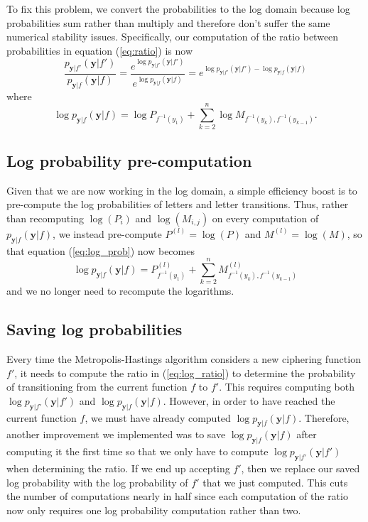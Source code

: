 \documentclass{article}
\begin{document}
To fix this problem, we convert the probabilities to the log domain because log probabilities sum rather than multiply and therefore don't suffer the same numerical stability issues. Specifically, our computation of the ratio between probabilities in equation (\ref{eq:ratio}) is now
\begin{equation}\label{eq:log_ratio}
    \frac{p_{\mathbf{y}|f'}(\mathbf{y}|f')}{p_{\mathbf{y}|f}(\mathbf{y}|f)} = \frac{e^{\log{p_{\mathbf{y}|f'}(\mathbf{y}|f')}}}{e^{\log{p_{\mathbf{y}|f}(\mathbf{y}|f)}}} = e^{\log{p_{\mathbf{y}|f'}(\mathbf{y}|f')} - \log{p_{\mathbf{y}|f}(\mathbf{y}|f)}}
\end{equation}
where
\begin{equation}\label{eq:log_prob}
    \log{p_{\mathbf{y}|f}(\mathbf{y}|f)} = \log{P_{f^{-1}(y_1)}} + \sum_{k=2}^n \log{M_{f^{-1}(y_k), f^{-1}(y_{k-1})}}.
\end{equation}

\subsection{Log probability pre-computation}

Given that we are now working in the log domain, a simple efficiency boost is to pre-compute the log probabilities of letters and letter transitions. Thus, rather than recomputing $\log(P_i)$ and $\log(M_{i,j})$ on every computation of $p_{\mathbf{y}|f}(\mathbf{y}|f)$, we instead pre-compute $P^{(l)} = \log(P)$ and $M^{(l)} = \log(M)$, so that equation (\ref{eq:log_prob}) now becomes
\begin{equation}\label{eq:log_prob_precompute}
    \log{p_{\mathbf{y}|f}(\mathbf{y}|f)} = P^{(l)}_{f^{-1}(y_1)} + \sum_{k=2}^n M^{(l)}_{f^{-1}(y_k), f^{-1}(y_{k-1})}
\end{equation}
and we no longer need to recompute the logarithms.

\subsection{Saving log probabilities}

Every time the Metropolis-Hastings algorithm considers a new ciphering function $f'$, it needs to compute the ratio in (\ref{eq:log_ratio}) to determine the probability of transitioning from the current function $f$ to $f'$. This requires computing both $\log{p_{\mathbf{y}|f'}(\mathbf{y}|f')}$ and $\log{p_{\mathbf{y}|f}(\mathbf{y}|f)}$. However, in order to have reached the current function $f$, we must have already computed $\log{p_{\mathbf{y}|f}(\mathbf{y}|f)}$. Therefore, another improvement we implemented was to save $\log{p_{\mathbf{y}|f}(\mathbf{y}|f)}$ after computing it the first time so that we only have to compute $\log{p_{\mathbf{y}|f'}(\mathbf{y}|f')}$ when determining the ratio. If we end up accepting $f'$, then we replace our saved log probability with the log probability of $f'$ that we just computed. This cuts the number of computations nearly in half since each computation of the ratio now only requires one log probability computation rather than two.
\end{document}
